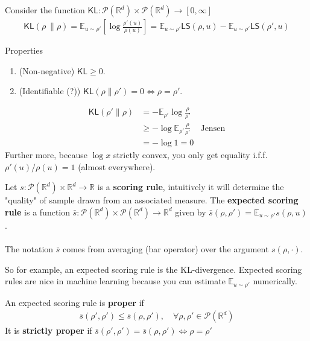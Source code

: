\documentclass[11pt,fleqn]{article}
\numberwithin{equation}{section}
\theoremstyle{definition}
\theoremstyle{definition}
\renewenvironment{proof}[1][\proofname]{\vspace{-10pt}\begin{replacementproof}}{\end{replacementproof}}
\begin{document}
\begin{definition}
	[KL Divergence] Consider the function $\textsf{KL}: \mathcal P(\mathbb R^d) \times \mathcal P(\mathbb R^d) \to [0, \infty]$
	\begin{align}
		\textsf{KL}(\rho\ \| \rho) = \mathbb E_{u \sim \rho'} \left[ \log \frac{\rho'(u)}{\rho(u)} \right] = \mathbb E_{u \sim \rho'} \textsf{LS}(\rho, u) - \mathbb E_{u \sim \rho'} \textsf{LS}(\rho', u)
	\end{align}
\end{definition}
Properties
\begin{enumerate}
	\item (Non-negative) $\textsf{KL} \geq 0$.
	\item (Identifiable (?)) $\textsf{KL}(\rho \| \rho') = 0 \iff \rho = \rho'$.
\end{enumerate}
\begin{proof} 
	\begin{align}
		\textsf{KL}(\rho' \| \rho) & = - \mathbb E_{\rho'} \log \frac{\rho}{\rho'}\\
		& \geq - \log \mathbb E_{\rho'} \frac{\rho}{\rho'} & \text{Jensen}\\
		& = - \log 1 = 0
	\end{align}
	Further more, because $\log x$ strictly convex, you only get equality i.f.f. $\rho'(u)/\rho(u) = 1$ (almost everywhere).
\end{proof}

\begin{definition}
	 Let $s: \mathcal P(\mathbb R^d) \times \mathbb R^d \to \mathbb R$ is a \textbf{scoring rule}, intuitively it will determine the "quality" of sample drawn from an associated measure. The \textbf{expected scoring rule} is a function $\bar s : \mathcal P(\mathbb R^d) \times \mathcal P(\mathbb R^d) \to \mathbb R^d$ given by $\bar s(\rho, \rho') = \mathbb E_{u \sim \rho'}s(\rho, u)$.
	\\
	\\
	The notation $\bar s$ comes from averaging (bar operator) over the argument $s(\rho, \cdot)$.
\end{definition}


So for example, an expected scoring rule is the KL-divergence. Expected scoring rules are nice in machine learning because you can estimate $\mathbb E_{u \sim \rho'}$ numerically.

\begin{definition}
	 An expected scoring rule is \textbf{proper} if
	\begin{align}
		\bar s(\rho', \rho') \leq \bar s(\rho, \rho'), \quad \forall \rho,\rho' \in \mathcal P(\mathbb R^d)
	\end{align}
	It is \textbf{strictly proper} if $\bar s(\rho', \rho') = \bar s(\rho, \rho') \iff \rho = \rho'$
\end{definition}
\end{document}
